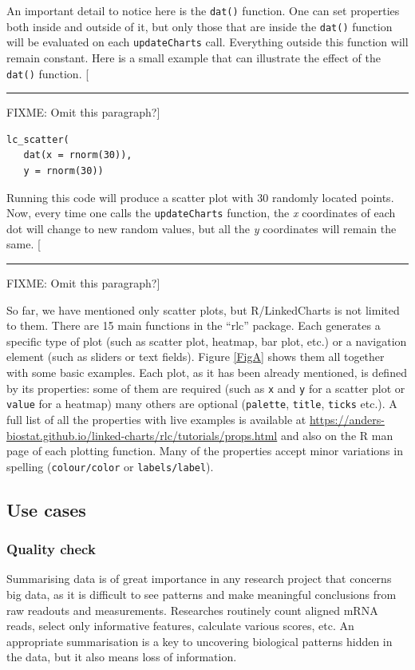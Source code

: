 \documentclass[twocolumn,10pt]{article}
\newcommand{\blockade}{\rule{3em}{0.7em}}  %
\newcommand{\fixme}[1]{[ \blockade FIXME: #1]}
\begin{document}
An important detail to notice here is the \texttt{dat()} function. One can set properties both inside and outside of it, but only those that are inside the \texttt{dat()} function will be evaluated on each \texttt{updateCharts} call. Everything outside this function will remain constant. Here is a small example that can illustrate the effect of the \texttt{dat()} function.  \fixme{Omit this paragraph?}

\begin{verbatim}
lc_scatter(
   dat(x = rnorm(30)),
   y = rnorm(30))
\end{verbatim}

Running this code will produce a scatter plot with 30 randomly located points. Now, every time one calls the \texttt{updateCharts} function, the \emph{x} coordinates of each dot will change to new random values, but all the \emph{y} coordinates will remain the same.  \fixme{Omit this paragraph?}

So far, we have mentioned only scatter plots, but R/LinkedCharts is not limited to them. There are 15 main functions in the ``rlc'' package. Each generates a specific type of plot (such as scatter plot, heatmap, bar plot, etc.) or a navigation element (such as sliders or text fields). Figure \ref{FigA} shows them all together with some basic examples. Each plot, as it has been already mentioned, is defined by its properties: some of them are required (such as \texttt{x} and \texttt{y} for a scatter plot or \texttt{value} for a heatmap) many others are optional (\texttt{palette}, \texttt{title}, \texttt{ticks} etc.). A full list of all the properties with live examples is available at \url{https://anders-biostat.github.io/linked-charts/rlc/tutorials/props.html} and also on the R man page of each plotting function. Many of the properties accept minor variations in spelling (\texttt{colour/color} or \texttt{labels/label}).

\subsection{Use cases}
\subsubsection{Quality check}

Summarising data is of great importance in any research project that concerns big data, as it is difficult to see patterns and make meaningful conclusions from raw readouts and measurements. Researches routinely count aligned mRNA reads, select only informative features, calculate various scores, etc. An appropriate summarisation is a key to uncovering biological patterns hidden in the data, but it also means loss of information.
\end{document}
